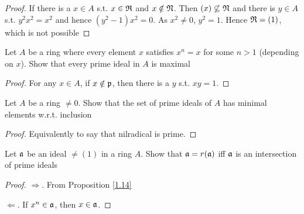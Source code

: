 \documentclass[11pt]{article}
\begin{document}
\begin{proof}
If there is a \(x\in A\) s.t. \(x\in\mathfrak{R}\) and \(x\notin\mathfrak{N}\). Then \((x)\not\subseteq\mathfrak{N}\) and there is \(y\in A\)
s.t. \(y^2x^2=x^2\) and hence \((y^2-1)x^2=0\). As \(x^2\neq 0\), \(y^2=1\). Hence \(\mathfrak{R}=(1)\), which is not possible
\end{proof}

\begin{exercise}
\label{ex1.7}
Let \(A\) be a ring where every element \(x\) satisfies \(x^n=x\) for some \(n>1\) (depending
on \(x\)). Show that every prime ideal in \(A\) is maximal
\end{exercise}

\begin{proof}
For any \(x\in A\), if \(x\notin\mathfrak{p}\), then there is a \(y\) s.t. \(xy=1\).
\end{proof}

\begin{exercise}
\label{ex1.8}
Let \(A\) be a ring \(\neq 0\). Show that the set of prime ideals of \(A\) has minimal elements
w.r.t. inclusion
\end{exercise}

\begin{proof}
Equivalently to say that nilradical is prime.
\end{proof}

\begin{exercise}
\label{ex1.9}
Let \(\mathfrak{a}\) be an ideal \(\neq(1)\) in a ring \(A\). Show that \(\mathfrak{a}=r(\mathfrak{a})\) iff \(\mathfrak{a}\) is an
intersection of prime ideals
\end{exercise}

\begin{proof}
\(\Rightarrow\). From Proposition \ref{1.14}

\(\Leftarrow\). If \(x^n\in\mathfrak{a}\), then \(x\in\mathfrak{a}\).
\end{proof}
\end{document}
